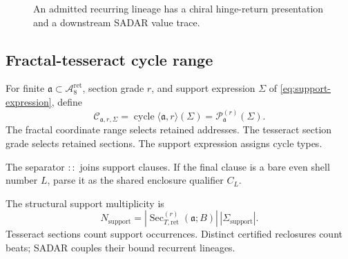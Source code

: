 \begin{figure}[H]
\centering
{}
\caption{An admitted recurring lineage has a chiral hinge-return presentation and a downstream SADAR value trace.}
\label{fig:cycle-wave-identity}
\end{figure}

\subsection{Fractal-tesseract cycle range}
\label{subsec:fractal-tesseract-cycle-range}
For finite \(\mathfrak a\subset\mathcal A^{\mathrm{ret}}_8\), section grade
\(r\), and support expression \(\Sigma\) of \eqref{eq:support-expression}, define
\begin{equation}
\mathcal C_{\mathfrak a,r,\Sigma}
=
\operatorname{cycle}\langle\mathfrak a,r\rangle(\Sigma)
=
\mathcal P^{(r)}_{\mathfrak a}(\Sigma).
\label{eq:fractal-tesseract-cycle-range}
\end{equation}
The fractal coordinate range selects retained addresses. The tesseract section grade selects retained sections. The support expression assigns cycle types.

The separator \(::\) joins support clauses. If the final clause is a bare even
shell number \(L\), parse it as the shared enclosure qualifier \(C_L\).

The structural support multiplicity is
\begin{equation}
N_{\mathrm{support}}
=
|\operatorname{Sec}^{(r)}_{T,\mathrm{ret}}(\mathfrak a;B)|\,|\Sigma_{\mathrm{support}}|.
\label{eq:beat-count}
\end{equation}
Tesseract sections count support occurrences. Distinct certified reclosures count beats; SADAR couples their bound recurrent lineages.

